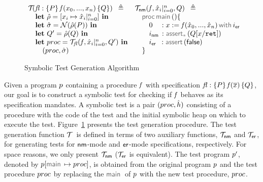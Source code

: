 \begin{figure}
{\footnotesize
$$
\begin{array}{lll}
\testify{}(\specsig{P}{\pid(\jvar_0, ..., \jvar_n)}{Q}{\flag}) \ \semeq                           &  \testify{\fnormal}(\pid, \svar_i|_{i=0}^n, Q) \ \semeq \\
%
\quad  \mathbf{let} \ \sstore =  [ \jvar_i \mapsto \svar_i|_{i=0}^n] \ \mathbf{in}        &  \quad \darkmath{\sf proc} \jsilmain () \{    \\
%
\quad  \mathbf{let} \ \sstate = \normaliser(\sstore(P)) \ \mathbf{in}                               &   \qquad 0_{\phantom{\sf nm}}: \jsilcall{\jvar}{\pid}{\svar_0, ..., \svar_n}{\errlab} \\
\quad  \mathbf{let} \ Q' = \sstore(Q) \ \mathbf{in}                                                           &  \qquad \retlab \, : \sepassert(Q[\jvar/\retvar])  \\
\quad  \mathbf{let} \ \proc = \testify{\flag}(\pid, \svar_i|_{i=0}^n, Q')  \ \mathbf{in}  &    \qquad \errlab \, \, \, : \jassert(\jfalse)   \\
\qquad (\proc, \sstate)                                                                                                 &  \quad \}  
\end{array}
$$}
\vspace*{-0.4cm}
\caption{\small Symbolic Test Generation Algorithm~\label{fig:test:generation}}
\vspace*{-0.2cm}
\end{figure}

Given a \jsil program $p$ containing a procedure $\mathit{f}$ with specification {\small ${\mathit{fl}} : \{ P \} \, \mathit{f}(\overline{x}) \, \{ Q \}$}, 
our goal is to construct a symbolic test for checking if $\mathit{f}$ behaves as its specification mandates.
A symbolic test is a pair $(proc, \hat{h})$ consisting of a \jsil procedure with the code of the test and the initial 
symbolic heap on which to execute the test. 
%
Figure~\ref{fig:test:generation} presents the test generation procedure. 
The test generation function $\mathcal{T}_{} \ $ is defined in terms 
of two auxiliary functions, $\mathcal{T}_{{\sf nm}}$ and $\mathcal{T}_{{\sf er}}$, for generating tests for ${\sf nm}$-mode and 
${\sf er}$-mode specifications, respectively. 
For space reasons, we only present $\mathcal{T}_{{\sf nm}}$ ($\mathcal{T}_{{\sf er}}$ is equivalent). 
The test program $p'$, denoted by $\prog[\jsilmain \mapsto \proc]$, is obtained from the original program $p$ and the test procedure $proc$ by replacing the 
$\jsilmain$ of $p$ with the new test procedure, $proc$. 

